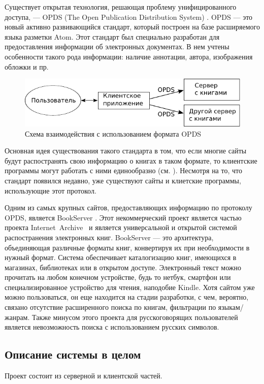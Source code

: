 Существует открытая технология, решающая проблему унифицированного доступа, --- OPDS (The Open Publication Distribution System) \cite{opds}.
OPDS --- это новый активно развивающийся стандарт, который построен на базе расширяемого языка разметки Atom. Этот стандарт был специально разработан для предоставления информации об электронных документах. В нем учтены особенности такого рода информации: наличие аннотации, автора, изображения обложки и пр.



\begin{figure}
\centering
\includegraphics[width=.7\textwidth]{./head/scheme}
\caption{Схема взаимодействия с использованием формата OPDS}\label{fig:scheme}
\end{figure}
Основная идея существования такого стандарта в том, что если многие сайты будут распостранять свою информацию о книгах в таком формате, то клиентские программы могут работать с ними единообразно (см. ). Несмотря на то, что стандарт появился недавно, уже существуют сайты и клиетские программы, использующие этот протокол. 


Одним из самых крупных сайтов, предоставляющих информацию по протоколу OPDS, является BookServer \cite{bookserver}.
Этот некоммерческий проект является частью проекта Internet~Archive~\cite{archive} и является универсальной и открытой системой распостранения электронных книг. BookServer --- это архитектура, объединяющая различные форматы книг, конвертируя их при необходимости в нужный формат. Система обеспечивает каталогизацию книг, имеющихся в магазинах, библиотеках или в открытом доступе. Электронный текст можно прочитать на любом конечном устройстве, будь то нетбук, смартфон или специализированное устройство для чтения, наподобие Kindle. Хотя сайтом уже можно пользоваться, он еще находится на стадии разработки, с чем, вероятно, связано отсутствие расширенного поиска по книгам, фильтрации по языкам/жанрам. Также минусом этого проекта для русскоговорящих пользователей является невозможность поиска с использованием русских символов.

\subsection{Описание системы в целом}
Проект состоит из серверной и клиентской частей.


